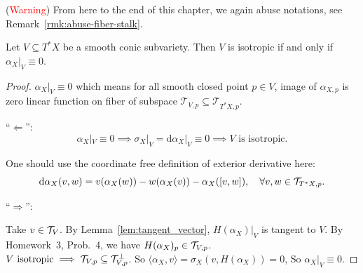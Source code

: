 \begin{remark}(\textcolor{red}{Warning})
    From here to the end of this chapter, we again abuse notations, see Remark~\ref{rmk:abuse-fiber-stalk}.
\end{remark}

\begin{lemma}\label{lem:9.5}
    Let $V\subseteq T^\ast X$ be a smooth conic subvariety.  Then $V$ is isotropic
    if and only if $\alpha_X|_V\equiv 0$.
\end{lemma}
\begin{proof}
    $\alpha_X|_V\equiv 0$ which means for all smooth closed point $p\in V$, image of $\alpha_{X,p}$ is zero linear function on fiber of subspace $\mathcal{T}_{V,p}\subseteq \mathcal{T}_{T^{\ast}X,p}$.

    \noindent ``$\Leftarrow$'':
    \[
        \alpha_X|_V \equiv 0 \implies \sigma_X|_V = \text{d}\alpha_X|_V \equiv 0 \implies V \text{ is isotropic.}
    \]

    One should use the coordinate free definition of exterior derivative here:
    \[
        \text{d}\alpha_X (v,w) = v(\alpha_X(w)) - w(\alpha_X(v)) - \alpha_X([v,w]), \quad \forall v,w \in \mathcal{T}_{T^{\ast}X,p}.
    \]

    \noindent ``$\Rightarrow$'':

    Take $v \in \mathcal{T}_V$. By Lemma~\ref{lem:tangent_vector}, $H(\alpha_X)|_V$ is tangent to $V$. By Homework~3, Prob.~4, we have $H(\alpha_X)_p \in \mathcal{T}_{V,p}$.\\

    $V \text{ isotropic} \implies \mathcal{T}_{V,p} \subseteq \mathcal{T}_{V,p}^\perp$. So $\langle \alpha_X, v \rangle = \sigma_X ( v, H(\alpha_X) ) = 0$, So $\alpha_X|_V \equiv 0$.
\end{proof}

